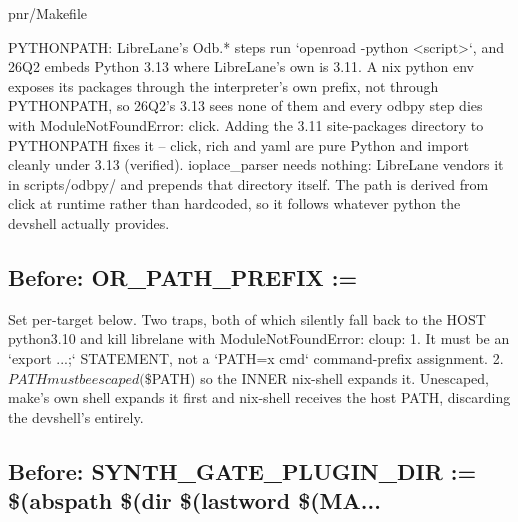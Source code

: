 \begin{relocated}{pnr/Makefile}
\begin{textblock}
PYTHONPATH: LibreLane's Odb.* steps run `openroad -python <script>`, and
26Q2 embeds Python 3.13 where LibreLane's own is 3.11. A nix python env
exposes its packages through the interpreter's own prefix, not through
PYTHONPATH, so 26Q2's 3.13 sees none of them and every odbpy step dies
with ModuleNotFoundError: click. Adding the 3.11 site-packages directory
to PYTHONPATH fixes it -- click, rich and yaml are pure Python and import
cleanly under 3.13 (verified). ioplace_parser needs nothing: LibreLane
vendors it in scripts/odbpy/ and prepends that directory itself.
The path is derived from click at runtime rather than hardcoded, so it
follows whatever python the devshell actually provides.
\end{textblock}

\subsection*{Before: OR\_PATH\_PREFIX      :=}

\begin{textblock}
Set per-target below. Two traps, both of which silently fall back to the
HOST python3.10 and kill librelane with ModuleNotFoundError: cloup:
  1. It must be an `export ...;` STATEMENT, not a `PATH=x cmd`
     command-prefix assignment.
  2. $PATH must be escaped (\$$PATH) so the INNER nix-shell expands it.
     Unescaped, make's own shell expands it first and nix-shell receives
     the host PATH, discarding the devshell's entirely.
\end{textblock}

\subsection*{Before: SYNTH\_GATE\_PLUGIN\_DIR := \$(abspath \$(dir \$(lastword \$(MA...}



\end{relocated}

